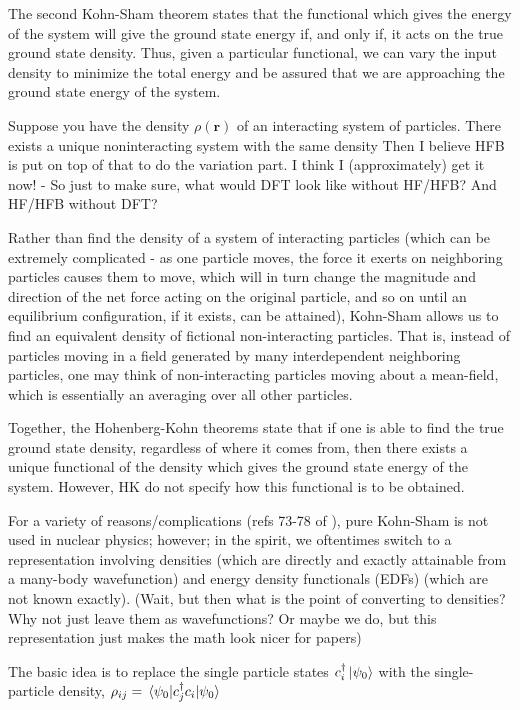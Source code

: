 The second Kohn-Sham theorem states that the functional which gives the energy of the system will give the ground state energy if, and only if, it acts on the true ground state density. Thus, given a particular functional, we can vary the input density to minimize the total energy and be assured that we are approaching the ground state energy of the system.

Suppose you have the density $\rho(\mathbf{r})$ of an interacting system of particles. There exists a unique noninteracting system with the same density
Then I believe HFB is put on top of that to do the variation part. I think I (approximately) get it now! - So just to make sure, what would DFT look like without HF/HFB? And HF/HFB without DFT?

Rather than find the density of a system of interacting particles (which can be extremely complicated - as one particle moves, the force it exerts on neighboring particles causes them to move, which will in turn change the magnitude and direction of the net force acting on the original particle, and so on until an equilibrium configuration, if it exists, can be attained), Kohn-Sham allows us to find an equivalent density of fictional non-interacting particles. That is, instead of particles moving in a field generated by many interdependent neighboring particles, one may think of non-interacting particles moving about a mean-field, which is essentially an averaging over all other particles.

Together, the Hohenberg-Kohn theorems state that if one is able to find the true ground state density, regardless of where it comes from, then there exists a unique functional of the density which gives the ground state energy of the system. However, HK do not specify how this functional is to be obtained.

For a variety of reasons/complications (refs 73-78 of \cite{Schunck2016}), pure Kohn-Sham is not used in nuclear physics; however; in the spirit, we oftentimes switch to a representation involving densities (which are directly and exactly attainable from a many-body wavefunction) and energy density functionals (EDFs) (which are not known exactly). (Wait, but then what is the point of converting to densities? Why not just leave them as wavefunctions? Or maybe we do, but this representation just makes the math look nicer for papers)

The basic idea is to replace the single particle states $c_i^\dagger\ket{\psi_0}$ with the single-particle density, $\rho_{ij} = \expval{c_j^\dagger c_i}{\psi_0}$

